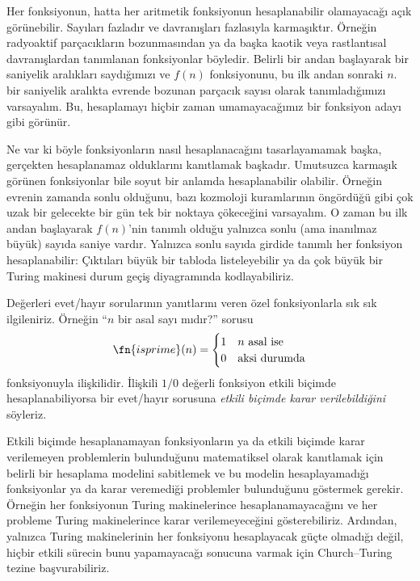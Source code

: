 \documentclass[../../../include/open-logic-section]{subfiles}
\begin{document}

Her fonksiyonun, hatta her aritmetik fonksiyonun hesaplanabilir olamayacağı
açık görünebilir. Sayıları fazladır ve davranışları fazlasıyla karmaşıktır.
Örneğin radyoaktif parçacıkların bozunmasından ya da başka kaotik veya
rastlantısal davranışlardan tanımlanan fonksiyonlar böyledir. Belirli bir
andan başlayarak bir saniyelik aralıkları saydığımızı ve $f(n)$ fonksiyonunu,
bu ilk andan sonraki $n$. bir saniyelik aralıkta evrende bozunan parçacık
sayısı olarak tanımladığımızı varsayalım. Bu, hesaplamayı hiçbir zaman
umamayacağımız bir fonksiyon adayı gibi görünür.

Ne var ki böyle fonksiyonların nasıl hesaplanacağını tasarlayamamak başka,
gerçekten hesaplanamaz olduklarını kanıtlamak başkadır. Umutsuzca karmaşık
görünen fonksiyonlar bile soyut bir anlamda hesaplanabilir olabilir. Örneğin
evrenin zamanda sonlu olduğunu, bazı kozmoloji kuramlarının öngördüğü gibi çok
uzak bir gelecekte bir gün tek bir noktaya çökeceğini varsayalım. O zaman bu
ilk andan başlayarak $f(n)$'nin tanımlı olduğu yalnızca sonlu (ama inanılmaz
büyük) sayıda saniye vardır. Yalnızca sonlu sayıda girdide tanımlı her
fonksiyon hesaplanabilir: Çıktıları büyük bir tabloda listeleyebilir ya da çok
büyük bir Turing makinesi durum geçiş diyagramında kodlayabiliriz.

Değerleri evet/hayır sorularının yanıtlarını veren özel fonksiyonlarla sık
sık ilgileniriz. Örneğin ``$n$ bir asal sayı mıdır?'' sorusu
\[
\fn{isprime}(n) = \begin{cases}
  1 & \text{$n$ asal ise}\\
  0 & \text{aksi durumda}
  \end{cases}
\]
fonksiyonuyla ilişkilidir. İlişkili $1/0$ değerli fonksiyon etkili biçimde
hesaplanabiliyorsa bir evet/hayır sorusuna \emph{etkili biçimde karar
verilebildiğini} söyleriz.

Etkili biçimde hesaplanamayan fonksiyonların ya da etkili biçimde karar
verilemeyen problemlerin bulunduğunu matematiksel olarak kanıtlamak için
belirli bir hesaplama modelini sabitlemek ve bu modelin hesaplayamadığı
fonksiyonlar ya da karar veremediği problemler bulunduğunu göstermek gerekir.
Örneğin her fonksiyonun Turing makinelerince hesaplanamayacağını ve her
probleme Turing makinelerince karar verilemeyeceğini gösterebiliriz. Ardından,
yalnızca Turing makinelerinin her fonksiyonu hesaplayacak güçte olmadığı değil,
hiçbir etkili sürecin bunu yapamayacağı sonucuna varmak için Church--Turing
tezine başvurabiliriz.
\end{document}
